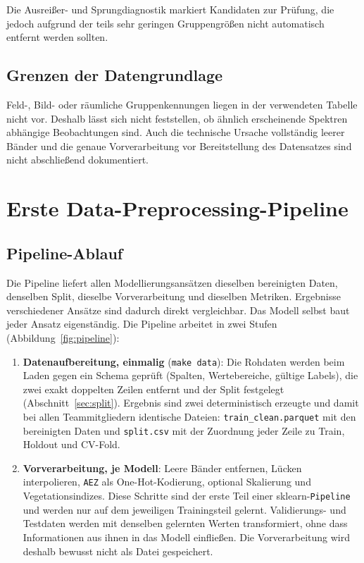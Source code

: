 \documentclass[11pt,a4paper]{article}
\begin{document}
Die Ausreißer- und Sprungdiagnostik markiert Kandidaten zur Prüfung, die jedoch aufgrund der teils 
sehr geringen Gruppengrößen nicht automatisch entfernt werden sollten.

\subsection{Grenzen der Datengrundlage}

Feld-, Bild- oder räumliche Gruppenkennungen liegen in der verwendeten Tabelle nicht vor.
Deshalb lässt sich nicht feststellen, ob ähnlich erscheinende Spektren abhängige Beobachtungen
sind. Auch die technische Ursache vollständig leerer Bänder und die genaue Vorverarbeitung vor
Bereitstellung des Datensatzes sind nicht abschließend dokumentiert. 

\section{Erste Data-Preprocessing-Pipeline}

\subsection{Pipeline-Ablauf}

Die Pipeline liefert allen Modellierungsansätzen dieselben bereinigten Daten, denselben Split,
dieselbe Vorverarbeitung und dieselben Metriken. Ergebnisse verschiedener Ansätze sind dadurch
direkt vergleichbar. Das Modell selbst baut jeder Ansatz eigenständig. Die Pipeline arbeitet in
zwei Stufen (Abbildung~\ref{fig:pipeline}):

\begin{enumerate}
  \item \textbf{Datenaufbereitung, einmalig} (\texttt{make data}): Die Rohdaten werden beim
        Laden gegen ein Schema geprüft (Spalten, Wertebereiche, gültige Labels), die zwei exakt
        doppelten Zeilen entfernt und der Split festgelegt (Abschnitt~\ref{sec:split}).
        Ergebnis sind zwei deterministisch erzeugte und damit bei allen Teammitgliedern
        identische Dateien: \texttt{train\_clean.parquet} mit den bereinigten Daten und
        \texttt{split.csv} mit der Zuordnung jeder Zeile zu Train, Holdout und CV-Fold.
  \item \textbf{Vorverarbeitung, je Modell}: Leere Bänder entfernen, Lücken interpolieren,
        \texttt{AEZ} als One-Hot-Kodierung, optional Skalierung und Vegetationsindizes. Diese
        Schritte sind der erste Teil einer sklearn-\texttt{Pipeline} und werden nur auf dem
        jeweiligen Trainingsteil gelernt. Validierungs- und Testdaten werden mit denselben
        gelernten Werten transformiert, ohne dass Informationen aus ihnen in das Modell
        einfließen. Die Vorverarbeitung wird deshalb bewusst nicht als Datei gespeichert.
\end{enumerate}
\end{document}
